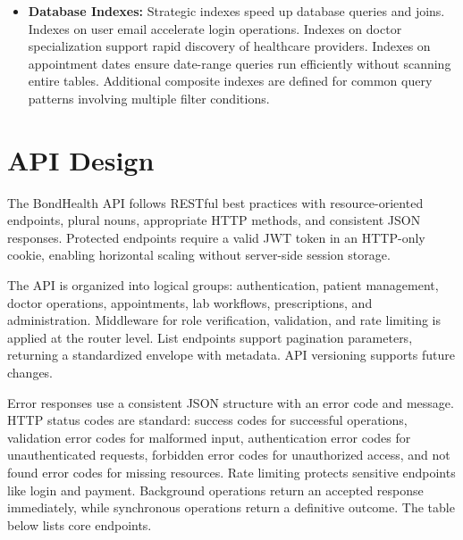 \vspace{0.3cm}
\begin{itemize}
    \item \textbf{Database Indexes:} Strategic indexes speed up database queries and joins. Indexes on user email accelerate login operations. Indexes on doctor specialization support rapid discovery of healthcare providers. Indexes on appointment dates ensure date-range queries run efficiently without scanning entire tables. Additional composite indexes are defined for common query patterns involving multiple filter conditions.
\end{itemize}


\section{API Design}

\justifying
\noindent The BondHealth API follows RESTful best practices with resource-oriented endpoints, plural nouns, appropriate HTTP methods, and consistent JSON responses. Protected endpoints require a valid JWT token in an HTTP-only cookie, enabling horizontal scaling without server-side session storage.

\justifying
\noindent The API is organized into logical groups: authentication, patient management, doctor operations, appointments, lab workflows, prescriptions, and administration. Middleware for role verification, validation, and rate limiting is applied at the router level. List endpoints support pagination parameters, returning a standardized envelope with metadata. API versioning supports future changes.

\justifying
\noindent Error responses use a consistent JSON structure with an error code and message. HTTP status codes are standard: success codes for successful operations, validation error codes for malformed input, authentication error codes for unauthenticated requests, forbidden error codes for unauthorized access, and not found error codes for missing resources. Rate limiting protects sensitive endpoints like login and payment. Background operations return an accepted response immediately, while synchronous operations return a definitive outcome. The table below lists core endpoints.

